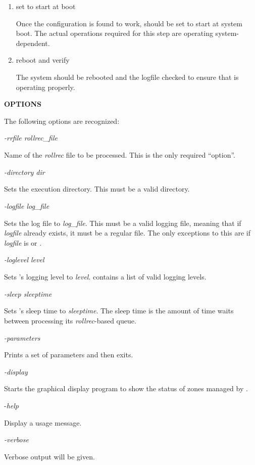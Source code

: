 \begin{enumerate}
\item set  to start at boot\verb" "

Once the configuration is found to work,  should be set to start
at system boot.  The actual operations required for this step are operating
system-dependent.

\item reboot and verify\verb" "

The system should be rebooted and the  logfile checked to ensure
that  is operating properly.

\end{enumerate}

{\bf OPTIONS}

The following options are recognized:

\begin{description}

\item {\it -rrfile rollrec\_file}\verb" "

Name of the {\it rollrec} file to be processed.  This is the only required
``option''.

\item {\it -directory dir}\verb" "

Sets the  execution directory.  This must be a valid directory.

\item {\it -logfile log\_file}\verb" "

Sets the  log file to {\it log\_file}.  This must be a valid
logging file, meaning that if {\it logfile} already exists, it must be a
regular file.  The only exceptions to this are if {\it logfile} is
 or .

\item {\it -loglevel level}\verb" "

Sets 's logging level to {\it level}.  
contains a list of valid logging levels.

\item {\it -sleep sleeptime}\verb" "

Sets 's sleep time to {\it sleeptime}.  The sleep time is the
amount of time  waits between processing its {\it rollrec}-based
queue.

\item {\it -parameters}\verb" "

Prints a set of  parameters and then exits.

\item {\it -display}\verb" "

Starts the  graphical display program to show the status of
zones managed by .

\item -{\it help}\verb" "

Display a usage message.

\item {\it -verbose}\verb" "

Verbose output will be given.

\end{description}

